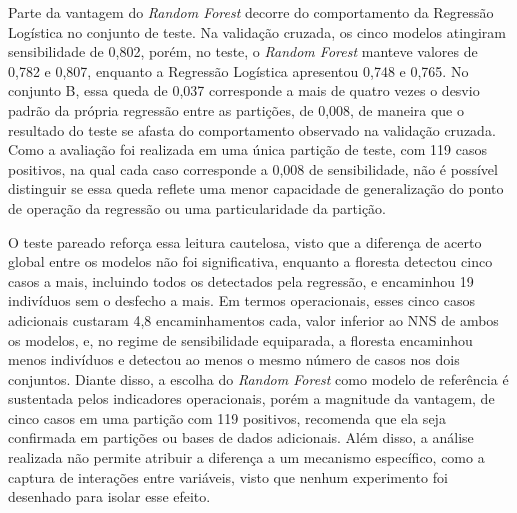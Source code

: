 Parte da vantagem do \textit{Random Forest} decorre do comportamento da Regressão Logística no conjunto de teste. Na validação cruzada, os cinco modelos atingiram sensibilidade de 0,802, porém, no teste, o \textit{Random Forest} manteve valores de 0,782 e 0,807, enquanto a Regressão Logística apresentou 0,748 e 0,765. No conjunto B, essa queda de 0,037 corresponde a mais de quatro vezes o desvio padrão da própria regressão entre as partições, de 0,008, de maneira que o resultado do teste se afasta do comportamento observado na validação cruzada. Como a avaliação foi realizada em uma única partição de teste, com 119 casos positivos, na qual cada caso corresponde a 0,008 de sensibilidade, não é possível distinguir se essa queda reflete uma menor capacidade de generalização do ponto de operação da regressão ou uma particularidade da partição.

O teste pareado reforça essa leitura cautelosa, visto que a diferença de acerto global entre os modelos não foi significativa, enquanto a floresta detectou cinco casos a mais, incluindo todos os detectados pela regressão, e encaminhou 19 indivíduos sem o desfecho a mais. Em termos operacionais, esses cinco casos adicionais custaram 4,8 encaminhamentos cada, valor inferior ao NNS de ambos os modelos, e, no regime de sensibilidade equiparada, a floresta encaminhou menos indivíduos e detectou ao menos o mesmo número de casos nos dois conjuntos. Diante disso, a escolha do \textit{Random Forest} como modelo de referência é sustentada pelos indicadores operacionais, porém a magnitude da vantagem, de cinco casos em uma partição com 119 positivos, recomenda que ela seja confirmada em partições ou bases de dados adicionais. Além disso, a análise realizada não permite atribuir a diferença a um mecanismo específico, como a captura de interações entre variáveis, visto que nenhum experimento foi desenhado para isolar esse efeito.

